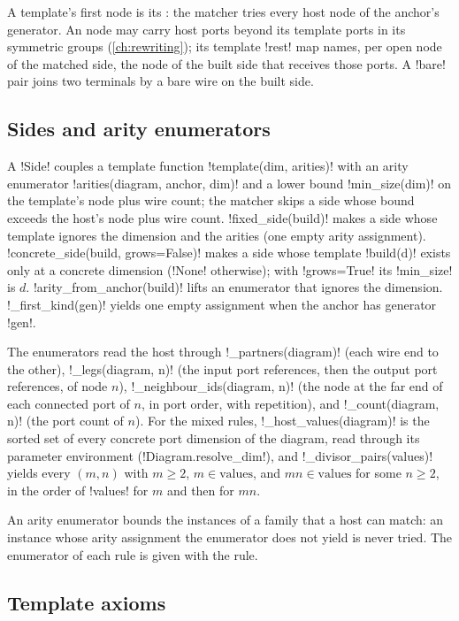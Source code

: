A template's first node is its : the matcher tries every host node of the anchor's
generator. An  node may carry host ports beyond its template ports in its symmetric
groups (\cref{ch:rewriting}); its template \py!rest! map names, per open node of the matched side,
the node of the built side that receives those ports. A \py!bare! pair joins two terminals by a
bare wire on the built side.

\subsection{Sides and arity enumerators}

A \py!Side! couples a template function \py!template(dim, arities)! with an arity enumerator
\py!arities(diagram, anchor, dim)! and a lower bound \py!min_size(dim)! on the template's node plus
wire count; the matcher skips a side whose bound exceeds the host's node plus wire count.
\py!fixed_side(build)! makes a side whose template ignores the dimension and the arities (one
empty arity assignment). \py!concrete_side(build, grows=False)! makes a side whose template
\py!build(d)! exists only at a concrete dimension (\py!None! otherwise); with \py!grows=True! its
\py!min_size! is $d$. \py!arity_from_anchor(build)! lifts an enumerator that ignores the dimension.
\py!_first_kind(gen)! yields one empty assignment when the anchor has generator \py!gen!.

The enumerators read the host through \py!_partners(diagram)! (each wire end to the other),
\py!_legs(diagram, n)! (the input port references, then the output port references, of node
$n$), \py!_neighbour_ids(diagram, n)! (the node at the far end of each connected port of $n$,
in port order, with repetition), and \py!_count(diagram, n)! (the port count of $n$). For the
mixed rules, \py!_host_values(diagram)! is the sorted set of every concrete port dimension of the
diagram, read through its parameter environment (\py!Diagram.resolve_dim!), and
\py!_divisor_pairs(values)! yields every $(m,n)$ with $m\ge 2$, $m\in\text{values}$, and $mn\in\text{values}$
for some $n\ge2$, in the order of \py!values! for $m$ and then for $mn$.

An arity enumerator bounds the instances of a family that a host can match: an instance whose
arity assignment the enumerator does not yield is never tried. The enumerator of each rule is
given with the rule.

\subsection{Template axioms}

